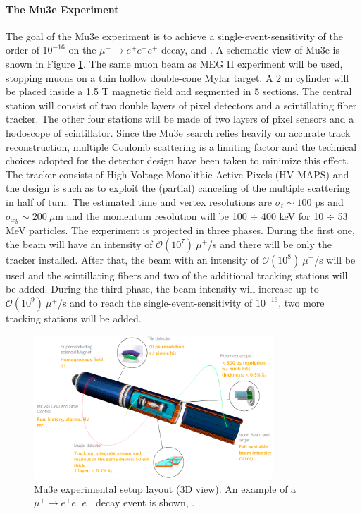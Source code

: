 \paragraph{The Mu3e Experiment}
The goal of the Mu3e experiment is to achieve a single-event-sensitivity of the order
of $10^{-16}$ on the $\mu^+ \rightarrow e^+ e^-  e^+ $ decay, \cite{hesketh2022mu3e} and \cite{papa}. 
A schematic view of Mu3e is shown in Figure \ref{fig:mu3e}.
The same muon beam as MEG II experiment will be used, stopping muons on a thin hollow double-cone Mylar target. 
A 2 m cylinder will be placed inside a 1.5 T magnetic field and segmented in 5 sections. 
The central station will consist of two double layers of pixel detectors and a
scintillating fiber tracker. The other four stations will be made of two layers of pixel
sensors and a hodoscope of scintillator. Since the Mu3e search relies heavily on accurate track reconstruction, multiple Coulomb
scattering is a limiting factor and the technical choices adopted for the detector design
have been taken to minimize this effect. The tracker consists of High Voltage Monolithic Active Pixels (HV-MAPS) 
and the design is such as to exploit the (partial) canceling of
the multiple scattering in half of turn. The estimated time and vertex resolutions are
$\sigma_t \sim 100$ ps and $\sigma_{xy} \sim 200 \ \mu$m and the momentum resolution will be 100 $\div$ 400 keV for 10 $\div$ 53
MeV particles. The experiment is projected in three phases. During the first one, the beam will have an intensity of $\mathcal{O}(10^7) \ \mu^+$/s 
and there will be only the tracker installed. After that, the beam with an intensity of $\mathcal{O}(10^8) \ \mu^+$/s will 
be used and the scintillating fibers and two of the additional tracking stations will be added.
During the third phase, the beam intensity will increase up to $\mathcal{O}(10^9) \ \mu^+$/s and to 
reach the single-event-sensitivity of $10^{-16}$, two more tracking stations will be added.
\begin{figure}[!h]
\centering
\includegraphics[width =0.8\textwidth]{figures/png/Screenshot_20240321_143650}
\caption[Mu3e experiment.]{Mu3e experimental setup layout (3D view). An example of a $\mu^+ \rightarrow e^+ e^-  e^+ $ decay event is shown, \cite{papa}.}
\label{fig:mu3e}
\end{figure}










